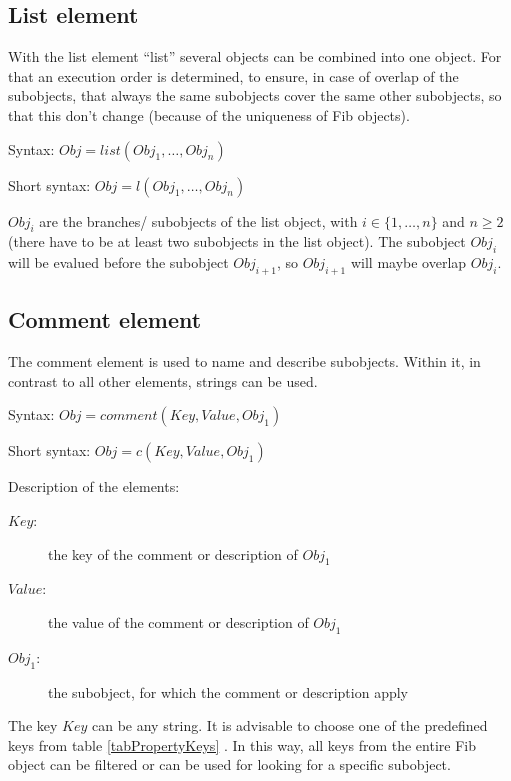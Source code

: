 
\subsection{List element}
\label{fibList}

With the list element ``list'' several objects can be combined into one object. For that an execution order is determined, to ensure, in case of overlap of the subobjects, that always the same subobjects cover the same other subobjects, so that this don't change (because of the uniqueness of Fib objects).

\bigskip\noindent
Syntax:
$Obj = list( Obj_1, \ldots, Obj_n)$

\bigskip\noindent
Short syntax:
$Obj = l( Obj_1, \ldots, Obj_n )$

\bigskip\noindent
$Obj_i$ are the branches/ subobjects of the list object, with $i \in\{1, \ldots ,n\}$ and $n \geq 2$ (there have to be at least two subobjects in the list object). The subobject $Obj_i$ will be evalued before the subobject $Obj_{i+1}$, so $Obj_{i+1}$ will maybe overlap $Obj_{i}$.



\subsection{Comment element}
\label{fibComment}\label{secFibComment}

The comment element is used to name and describe subobjects. Within it, in contrast to all other elements, strings can be used.

\bigskip\noindent
Syntax:
$Obj = comment( Key , Value , Obj_1)$

\bigskip\noindent
Short syntax:
$Obj = c( Key , Value , Obj_1)$

\bigskip\noindent
Description of the elements:
\begin{description}
 \item[$Key$:] the key of the comment or description of  $Obj_1$
 \item[$Value$:] the value of the comment or description of $Obj_1$
 \item[$Obj_1$:] the subobject, for which the comment or description apply
\end{description}

The key $Key$ can be any string. It is advisable to choose one of the predefined keys from table \ref{tabPropertyKeys} .
In this way, all keys from the entire Fib object can be filtered or can be used for looking for a specific subobject.

